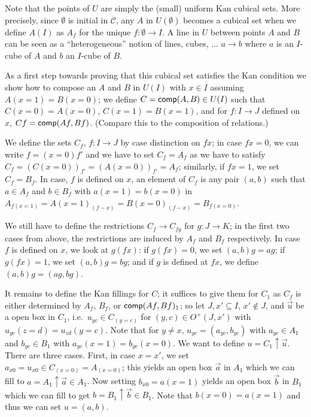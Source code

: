 \documentclass[10pt,a4paper]{article}
\newcommand{\CC}{{\mathcal C}}
\newcommand{\comp}{{\sf comp}}
\newcommand{\es}{\emptyset}
\newcommand{\rup}[1]{#1{\uparrow}}
\newcommand{\OO}{O}
\begin{document}
Note that the points of $U$ are simply the (small) uniform Kan cubical
sets. More precisely, since $\es$ is initial in $\CC$,
any $A$ in $U(\es)$ becomes a cubical set when we define
$A(I)$ as $A_f$ for the unique $f:\es\to I$.
 A line in $U$ between points $A$ and $B$ can be seen as a
``heterogeneous'' notion of lines, cubes, $\dots$ $a\to b$
where $a$ is an $I$-cube of $A$ and $b$ an $I$-cube of $B$.

As a first step towards proving that this cubical set satisfies the
Kan condition we show how to compose an $A$ and $B$ in $U(I)$ with $x
\in I$ assuming $A (x=1) = B(x=0)$; we define $C = \comp(A,B) \in U
(I)$ such that $C (x=0) = A (x=0)$, $C(x=1) = B(x=1)$, and for $f
\colon I \to J$ defined on $x$, $C f = \comp (Af, Bf)$.  (Compare this
to the composition of relations.)

We define the sets $C_f$, $f \colon I \to J$ by case distinction on $f
x$; in case $f x = 0$, we can write $f = (x=0) f'$ and we have to set
$C_f = A_f$ as we have to satisfy $C_f = (C(x=0))_{f'} = (A
(x=0))_{f'} = A_f$; similarly, if $f x = 1$, we set $C_f = B_f$.  In
case, $f$ is defined on $x$, an element of $C_f$ is any pair $(a,b)$
such that $a \in A_f$ and $b \in B_f$ with $a (x=1) = b (x=0)$ in
$A_{f (x=1)} = {A(x=1)}_{(f - x)} = {B(x=0)}_{(f - x)} = B_{f (x=0)}$.

We still have to define the restrictions $C_f \to C_{fg}$ for $g
\colon J \to K$; in the first two cases from above, the restrictions
are induced by $A_f$ and $B_f$ respectively.  In case $f$ is defined
on $x$, we look at $g(f x)$: if $g (f x)= 0$, we set $(a,b) g = ag$; if
$g (f x) = 1$, we set $(a,b)g = bg$; and if $g$ is defined at $f x$, we
define $(a,b)g = (ag,bg)$.

It remains to define the Kan fillings for $C$; it suffices to give
them for $C_1$ as $C_f$ is either determined by $A_f$, $B_f$, or
$\comp (Af,Bf)_1$; so let $J, x' \subseteq I$, $x' \notin J$, and
$\vec u$ be a open box in $C_1$, i.e.\ $u_{yc} \in C_{(y=c)}$ for
$(y,c) \in \OO^+ (J,x')$ with $u_{yc} (z=d) = u_{zd} (y=c)$.  Note
that for $y \neq x$, $u_{yc}= (a_{yc}, b_{yc})$ with $a_{yc} \in A_1$
and $b_{yc} \in B_1$ with $a_{yc} (x=1) = b_{yc} (x=0)$.  We want to
define $u = \rup{C_1}\vec u$.  There are three cases.  First, in case
$x = x'$, we set $a_{x0} = u_{x0} \in C_{(x=0)} = A_{(x=0)}$; this
yields an open box $\vec a$ in $A_1$ which we can fill to $a =
\rup{A_1} \vec a \in A_1$.  Now setting $b_{x0} = a (x=1)$ yields an
open box $\vec b$ in $B_1$ which we can fill to get $b = \rup{B_1}
\vec b \in B_1$. Note that $b(x=0) = a (x=1)$ and thus we can set $u =
(a, b)$.
\end{document}
